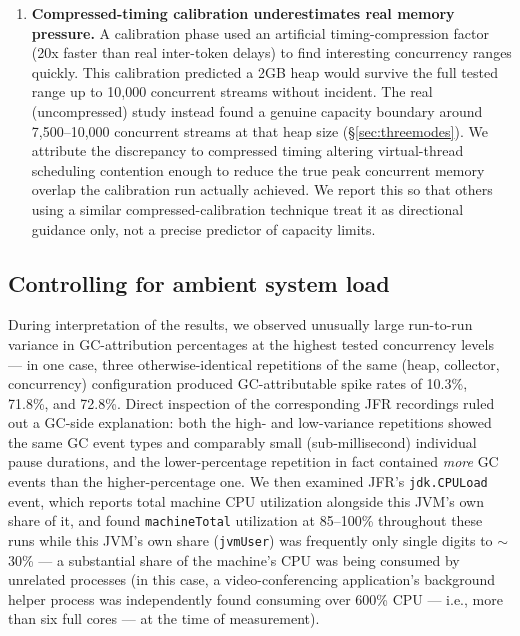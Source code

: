 \documentclass[11pt]{article}
\newcommand{\code}[1]{\texttt{#1}}
\begin{document}
\begin{enumerate}[leftmargin=1.5em]
  \item \textbf{Compressed-timing calibration underestimates real memory pressure.} A calibration
    phase used an artificial timing-compression factor (20x faster than real inter-token delays)
    to find interesting concurrency ranges quickly. This calibration predicted a 2GB heap would
    survive the full tested range up to 10{,}000 concurrent streams without incident. The real
    (uncompressed) study instead found a genuine capacity boundary around 7{,}500--10{,}000
    concurrent streams at that heap size (\S\ref{sec:threemodes}). We attribute the discrepancy
    to compressed timing altering virtual-thread scheduling contention enough to reduce the true
    peak concurrent memory overlap the calibration run actually achieved. We report this so that
    others using a similar compressed-calibration technique treat it as directional guidance
    only, not a precise predictor of capacity limits.
\end{enumerate}

\subsection{Controlling for ambient system load}
\label{sec:noise}

During interpretation of the results, we observed unusually large run-to-run variance in
GC-attribution percentages at the highest tested concurrency levels --- in one case, three
otherwise-identical repetitions of the same (heap, collector, concurrency) configuration produced
GC-attributable spike rates of 10.3\%, 71.8\%, and 72.8\%. Direct inspection of the corresponding
JFR recordings ruled out a GC-side explanation: both the high- and low-variance repetitions
showed the same GC event types and comparably small (sub-millisecond) individual pause durations,
and the lower-percentage repetition in fact contained \emph{more} GC events than the
higher-percentage one. We then examined JFR's \code{jdk.CPULoad} event, which reports total
machine CPU utilization alongside this JVM's own share of it, and found \code{machineTotal}
utilization at 85--100\% throughout these runs while this JVM's own share (\code{jvmUser}) was
frequently only single digits to $\sim$30\% --- a substantial share of the machine's CPU was
being consumed by unrelated processes (in this case, a video-conferencing application's
background helper process was independently found consuming over 600\% CPU --- i.e., more than
six full cores --- at the time of measurement).
\end{document}
